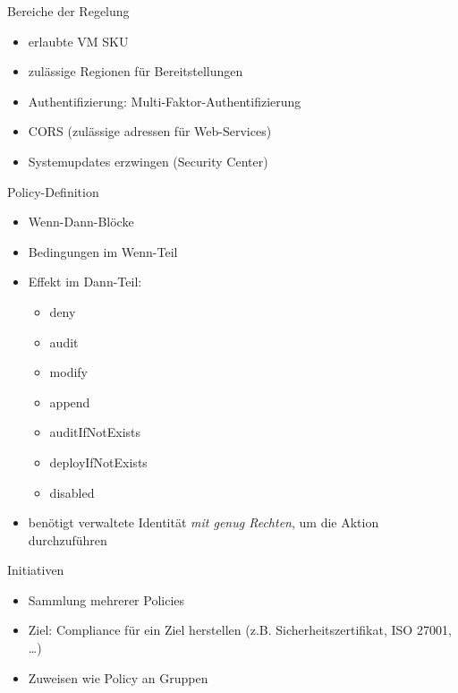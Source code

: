 \begin{flashcard}[Definition]{Bereiche der Regelung}
  \begin{itemize}
    \item erlaubte VM SKU
    \item zulässige Regionen für Bereitstellungen
    \item Authentifizierung: Multi-Faktor-Authentifizierung
    \item CORS (zulässige adressen für Web-Services)
    \item Systemupdates erzwingen (Security Center)
  \end{itemize}
\end{flashcard}

\begin{flashcard}[Definition]{Policy-Definition}
  \begin{itemize}
    \item Wenn-Dann-Blöcke
    \item Bedingungen im Wenn-Teil
    \item Effekt im Dann-Teil:
      \begin{itemize}
        \item deny
        \item audit
        \item modify
        \item append
        \item auditIfNotExists
        \item deployIfNotExists
        \item disabled
      \end{itemize}
    \item benötigt verwaltete Identität \emph{mit genug Rechten}, um die Aktion durchzuführen
  \end{itemize}
\end{flashcard}

\begin{flashcard}[Definition]{Initiativen}
  \begin{itemize}
    \item Sammlung mehrerer Policies
    \item Ziel: Compliance für ein Ziel herstellen (z.B. Sicherheitszertifikat, ISO 27001, \ldots)
    \item Zuweisen wie Policy an Gruppen
  \end{itemize}
\end{flashcard}

